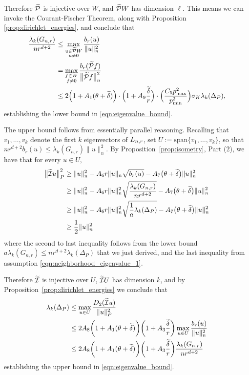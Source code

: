 Therefore $\widetilde{\mathcal{P}}$ is injective over $W$, and $\widetilde{\mathcal{P}}W$ has dimension $\ell$. This means we can invoke the Courant-Fischer Theorem, along with Proposition \ref{prop:dirichlet_energies}, and conclude that
\begin{align*}
\frac{\lambda_k(G_{n,r})}{nr^{d + 2}} & \leq \max_{\substack{u \in \widetilde{\mathcal{P}}W \\ u \neq 0} } \frac{b_r(u)}{\|u\|_{n}^2} \\
& = \max_{\substack{f \in W \\ f \neq 0} } \frac{b_r(\widetilde{\mathcal{P}}f)}{\bigl\|\widetilde{\mathcal{P}}f\bigr\|_{n}^2} \\
& \leq 2\Bigl(1 + A_1(\theta + \widetilde{\delta})\Bigr) \cdot \Bigl(1 + A_9\frac{\widetilde{\delta}}{r}\Bigr) \cdot \Bigl(\frac{C_5 p_{\max}^2}{p_{\min}^2}\Bigr) \sigma_K \lambda_{k}(\Delta_P),
\end{align*}
establishing the lower bound in \eqref{eqn:eigenvalue_bound}.

The upper bound follows from essentially parallel reasoning. Recalling that $v_1,\ldots,v_k$ denote the first $k$ eigenvectors of $L_{n,r}$, set $U := \mathrm{span}\{v_1,\ldots,v_k\}$, so that $nr^{d + 2} b_r(u) \leq \lambda_k(G_{n,r}) \|u\|_n^2$. By Proposition~\ref{prop:isometry}, Part (2), we have that for every $u \in U$,
\begin{align*}
\bigl\|\widetilde{\mathcal{I}}u\bigr\|_{P}^2 & \geq \|u\|_n^2 - A_6 r \|u\|_n \sqrt{b_r(u)} - A_7\bigl(\theta + \widetilde{\delta}\bigr)\|u\|_n^2 \\
& \geq \|u\|_n^2 - A_6 r \|u\|_n^2 \sqrt{\frac{\lambda_{k}(G_{n,r})}{nr^{d + 2}}} - A_7\bigl(\theta + \widetilde{\delta}\bigr)\|u\|_n^2 \\
& \geq \|u\|_n^2 - A_6 r \|u\|_n^2 \sqrt{\frac{1}{a}\lambda_k(\Delta_P)} - A_7\bigl(\theta + \widetilde{\delta}\bigr)\|u\|_n^2 \\
& \geq \frac{1}{2}\|u\|_n^2
\end{align*}
where the second to last inequality follows from the lower bound $a \lambda_k(G_{n,r}) \leq nr^{d + 2}\lambda_k(\Delta_P)$ that we just derived, and the last inequality from assumption \eqref{eqn:neighborhood_eigenvalue_1}.

Therefore $\widetilde{\mathcal{I}}$ is injective over $U$, $\widetilde{\mathcal{I}}U$ has dimension $k$, and by Proposition~\ref{prop:dirichlet_energies} we conclude that
\begin{align*}
\lambda_k(\Delta_P) & \leq \max_{u \in U} \frac{D_2(\widetilde{\mathcal{I}}u)}{\|u\|_P^2} \\
& \leq 2A_8\biggl(1 + A_1(\theta + \widetilde{\delta})\biggr) \biggl(1 + A_3 \frac{\widetilde{\delta}}{r}\biggr)\max_{u \in U} \frac{b_r(u)}{\|u\|_n^2} \\
& \leq 2A_8\biggl(1 + A_1(\theta + \widetilde{\delta})\biggr) \biggl(1 + A_3\frac{\widetilde{\delta}}{r}\biggr) \frac{\lambda_k(G_{n,r})}{nr^{d + 2}}
\end{align*}
establishing the upper bound in \eqref{eqn:eigenvalue_bound}.


